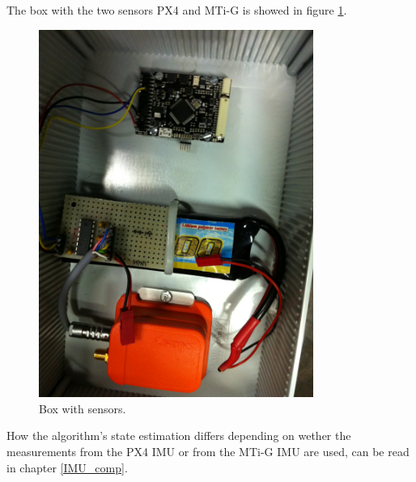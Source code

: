 The box with the two sensors PX4 and MTi-G is showed in figure \ref{box_setup}.
\begin{figure}[h]
\centering
\includegraphics[width=0.8\textwidth]{vicon_bilder/IMG_0130.JPG}
\caption{Box with sensors.}
\label{box_setup}
\end{figure}
How the algorithm's state estimation differs depending on wether the measurements from the PX4 IMU or from the MTi-G IMU are used, can be read in chapter \ref{IMU_comp}.

\FloatBarrier

